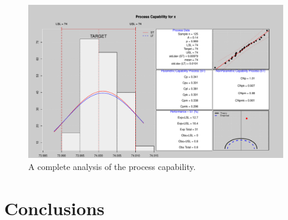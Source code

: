 %
\begin{figure}[H]
\begin{center}
\includegraphics[width=\textwidth]{article-caplot-plot}
\caption{A complete analysis of the process capability.}
\label{fig:caplot}
\end{center}
\end{figure}

 \section{Conclusions}

